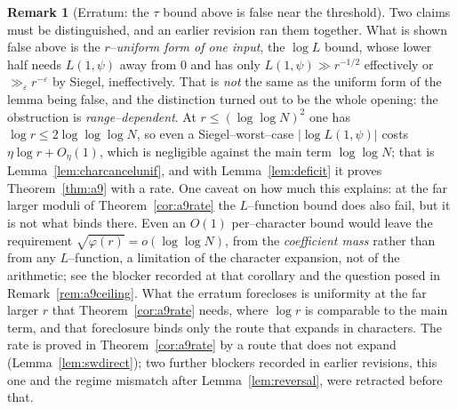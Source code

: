 \documentclass[11pt]{article}
\theoremstyle{definition}
\newtheorem{remark}[theorem]{Remark}
\begin{document}
\begin{remark}[Erratum: the $\tau$ bound above is false near the threshold]
Two claims must be distinguished, and an earlier revision ran them together. What is shown false
above is the $r$--\emph{uniform form of one input}, the $\log L$ bound, whose lower half needs
$L(1,\psi)$ away from $0$ and has only $L(1,\psi)\gg r^{-1/2}$ effectively or $\gg_\varepsilon
r^{-\varepsilon}$ by Siegel, ineffectively. That is \emph{not} the same as the uniform form of the
lemma being false, and the distinction turned out to be the whole opening: the obstruction is
\emph{range--dependent}. At $r\le(\log\log N)^2$ one has $\log r\le2\log\log\log N$, so even a
Siegel--worst--case $|\log L(1,\psi)|$ costs $\eta\log r+O_\eta(1)$, which is negligible against the
main term $\log\log N$; that is Lemma~\ref{lem:charcancelunif}, and with Lemma~\ref{lem:deficit} it
proves Theorem~\ref{thm:a9} with a rate. One caveat on how much this explains: at the far larger
moduli of Theorem~\ref{cor:a9rate} the $L$--function bound does also fail, but it is not what
binds there. Even an $O(1)$ per--character bound would leave the requirement
$\sqrt{\varphi(r)}=o(\log\log N)$, from the \emph{coefficient mass} rather than from any
$L$--function, a limitation of the character expansion, not of the arithmetic; see the blocker
recorded at that corollary and the question posed in Remark~\ref{rem:a9ceiling}. What the erratum forecloses is
uniformity at the far larger $r$ that Theorem~\ref{cor:a9rate} needs, where $\log r$ is comparable
to the main term, and that foreclosure binds only the route that expands in characters. The
rate is proved in Theorem~\ref{cor:a9rate} by a route that does not expand
\textup{(}Lemma~\ref{lem:swdirect}\textup{)}; two further blockers recorded in earlier revisions,
this one and the regime mismatch after Lemma~\ref{lem:reversal}, were retracted before that.
\end{remark}
\end{document}
